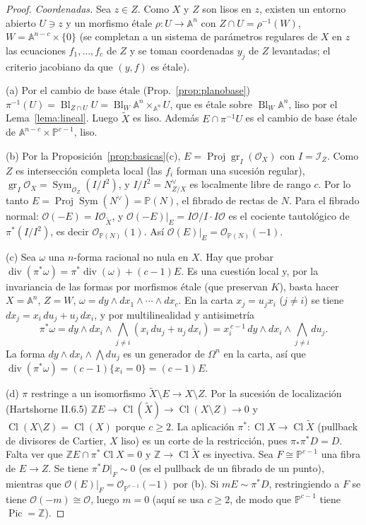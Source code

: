\documentclass[11pt,a4paper,oneside]{book}
\newcommand{\Proj}{\operatorname{Proj}}
\newcommand{\Bl}{\operatorname{Bl}}
\newcommand{\gr}{\operatorname{gr}}
\newcommand{\Pic}{\operatorname{Pic}}
\newcommand{\Cl}{\operatorname{Cl}}
\newcommand{\Sym}{\operatorname{Sym}}
\newcommand{\A}{\mathbb{A}}
\newcommand{\PP}{\mathbb{P}}
\newcommand{\ZZ}{\mathbb{Z}}
\newcommand{\cO}{\mathcal{O}}
\newcommand{\cI}{\mathcal{I}}
\theoremstyle{plain}
\theoremstyle{definition}
\theoremstyle{remark}
\begin{document}
\begin{proof}
\emph{Coordenadas.} Sea $z\in Z$. Como $X$ y $Z$ son lisos en $z$, existen un entorno abierto $U\ni z$ y un morfismo étale $\rho:U\to\A^n$ con $Z\cap U=\rho^{-1}(W)$, $W=\A^{n-c}\times\{0\}$ (se completan a un sistema de parámetros regulares de $X$ en $z$ las ecuaciones $f_1,\dots,f_c$ de $Z$ y se toman coordenadas $y_j$ de $Z$ levantadas; el criterio jacobiano da que $(y,f)$ es étale).

(a) Por el cambio de base étale (Prop.~\ref{prop:planobase}) $\pi^{-1}(U)=\Bl_{Z\cap U}U=\Bl_W\A^n\times_{\A^n}U$, que es étale sobre $\Bl_W\A^n$, liso por el Lema~\ref{lema:lineal}. Luego $\tilde X$ es liso. Además $E\cap\pi^{-1}U$ es el cambio de base étale de $\A^{n-c}\times\PP^{c-1}$, liso.

(b) Por la Proposición~\ref{prop:basicas}(c), $E=\Proj\gr_I(\cO_X)$ con $I=\cI_Z$. Como $Z$ es intersección completa local (las $f_i$ forman una sucesión regular), $\gr_I\cO_X=\Sym_{\cO_Z}(I/I^2)$, y $I/I^2=N^\vee_{Z/X}$ es localmente libre de rango $c$. Por lo tanto $E=\Proj\Sym(N^\vee)=\PP(N)$, el fibrado de rectas de $N$. Para el fibrado normal: $\cO(-E)=I\cO_{\tilde X}$, y $\cO(-E)|_E=I\cO/I\cdot I\cO$ es el cociente tautológico de $\pi^*(I/I^2)$, es decir $\cO_{\PP(N)}(1)$. Así $\cO(E)|_E=\cO_{\PP(N)}(-1)$.

(c) Sea $\omega$ una $n$-forma racional no nula en $X$. Hay que probar $\operatorname{div}(\pi^*\omega)=\pi^*\operatorname{div}(\omega)+(c-1)E$. Es una cuestión local y, por la invariancia de las formas por morfismos étale (que preservan $K$), basta hacer $X=\A^n$, $Z=W$, $\omega=dy\wedge dx_1\wedge\cdots\wedge dx_c$. En la carta $x_j=u_jx_i$ ($j\ne i$) se tiene $dx_j=x_i\,du_j+u_j\,dx_i$, y por multilinealidad y antisimetría
\[
\pi^*\omega=dy\wedge dx_i\wedge\bigwedge_{j\ne i}(x_i\,du_j+u_j\,dx_i)=x_i^{\,c-1}\,dy\wedge dx_i\wedge\bigwedge_{j\ne i}du_j .
\]
La forma $dy\wedge dx_i\wedge\bigwedge du_j$ es un generador de $\Omega^n$ en la carta, así que $\operatorname{div}(\pi^*\omega)=(c-1)\{x_i=0\}=(c-1)E$.

(d) $\pi$ restringe a un isomorfismo $\tilde X\setminus E\to X\setminus Z$. Por la sucesión de localización (Hartshorne II.6.5) $\ZZ E\to\Cl(\tilde X)\to\Cl(X\setminus Z)\to0$ y $\Cl(X\setminus Z)=\Cl(X)$ porque $c\ge2$. La aplicación $\pi^*:\Cl X\to\Cl\tilde X$ (pullback de divisores de Cartier, $X$ liso) es un corte de la restricción, pues $\pi_*\pi^*D=D$. Falta ver que $\ZZ E\cap\pi^*\Cl X=0$ y $\ZZ\to\Cl\tilde X$ es inyectiva. Sea $F\cong\PP^{c-1}$ una fibra de $E\to Z$. Se tiene $\pi^*D|_F\sim0$ (es el pullback de un fibrado de un punto), mientras que $\cO(E)|_F=\cO_{\PP^{c-1}}(-1)$ por (b). Si $mE\sim\pi^*D$, restringiendo a $F$ se tiene $\cO(-m)\cong\cO$, luego $m=0$ (aquí se usa $c\ge2$, de modo que $\PP^{c-1}$ tiene $\Pic=\ZZ$).
\end{proof}
\end{document}
